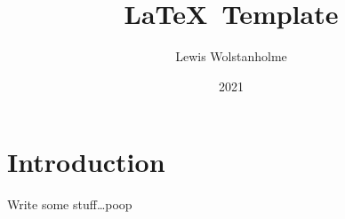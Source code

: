 
\title{
    \vspace{-36px}
    \LaTeX~Template                             %
}
\author{
    \normalsize{Lewis Wolstanholme}             %
}
\date{
    2021                                        %
}




\maketitle


\section*{Introduction}

Write some stuff\ldots poop

\pagebreak

